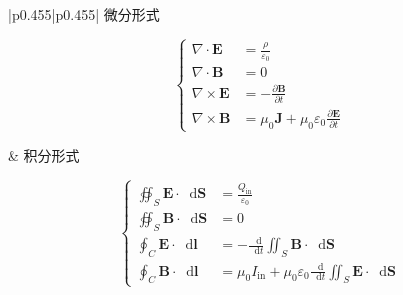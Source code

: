 \documentclass[UTF8,fontset=fandol,zihao=5]{ctexart}
\newcommand{\vect}[1]{\bm{#1}}
\newcommand{\dif}{\mathop{}\!\mathrm{d}}
\begin{document}
\small
\renewcommand{\arraystretch}{1.15}
\begin{longtable}{|p{}|p{}|}
\hline
\centering 微分形式

\[
\left\{
\begin{aligned}
\nabla\cdot\vect{E} &= \frac{\rho}{\varepsilon_0}\\
\nabla\cdot\vect{B} &= 0\\
\nabla\times\vect{E} &= -\frac{\partial\vect{B}}{\partial t}\\
\nabla\times\vect{B} &= \mu_0\vect{J}
+\mu_0\varepsilon_0\frac{\partial\vect{E}}{\partial t}
\end{aligned}
\right.
\]

& \centering\arraybackslash 积分形式

\[
\left\{
\begin{aligned}
\oiint_S \vect{E}\cdot\dif \vect{S}
&= \frac{Q_{\mathrm{in}}}{\varepsilon_0}\\
\oiint_S \vect{B}\cdot\dif \vect{S}
&= 0\\
\oint_C \vect{E}\cdot\dif \vect{l}
&= -\frac{\dif}{\dif t}
\iint_S \vect{B}\cdot\dif \vect{S}\\
\oint_C \vect{B}\cdot\dif \vect{l}
&= \mu_0 I_{\mathrm{in}}
+\mu_0\varepsilon_0\frac{\dif}{\dif t}
\iint_S \vect{E}\cdot\dif \vect{S}
\end{aligned}
\right.
\]

\\ \hline


\end{longtable}
\end{document}

